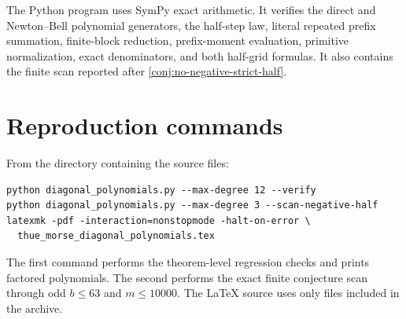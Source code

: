 \documentclass[11pt,oneside]{article}
\theoremstyle{definition}
\theoremstyle{remark}
\begin{document}
The Python program uses SymPy exact arithmetic.  It verifies the direct and
Newton--Bell polynomial generators, the half-step law, literal repeated
prefix summation, finite-block reduction, prefix-moment evaluation, primitive
normalization, exact denominators, and both half-grid formulas.  It also
contains the finite scan reported after
\cref{conj:no-negative-strict-half}.



\section{Reproduction commands}
\label{app:reproduce}

From the directory containing the source files:

\begin{lstlisting}[style=code]
python diagonal_polynomials.py --max-degree 12 --verify
python diagonal_polynomials.py --max-degree 3 --scan-negative-half
latexmk -pdf -interaction=nonstopmode -halt-on-error \
  thue_morse_diagonal_polynomials.tex
\end{lstlisting}

The first command performs the theorem-level regression checks and prints
factored polynomials.  The second performs the exact finite conjecture scan
through odd $b\le63$ and $m\le10000$.  The LaTeX source uses only files
included in the archive.
\end{document}
